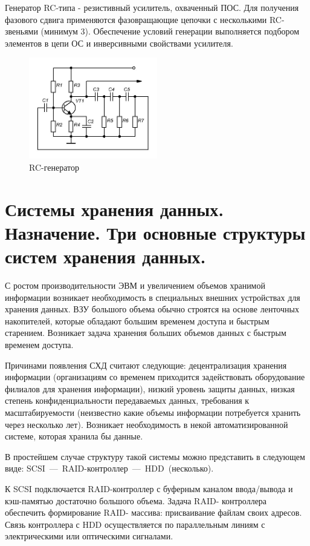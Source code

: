 \documentclass[unicode, 12pt, a4paper, oneside]{article}
\begin{document}
Генератор RC-типа - резистивный усилитель, охваченный ПОС. Для получения фазового сдвига применяются фазовращающие цепочки с несколькими RC-звеньями (минимум 3). Обеспечение условий генерации выполняется подбором элементов в цепи ОС и инверсивными свойствами усилителя.

\begin{figure}[H]
\centering
\includegraphics[width=0.5\textwidth]{150_rc.jpg}
\caption{RC-генератор}
\end{figure}

\section{Системы хранения данных. Назначение. Три основные структуры систем хранения данных.}

С ростом производительности ЭВМ и увеличением объемов хранимой информации возникает необходимость в специальных внешних устройствах для хранения данных. ВЗУ большого объема обычно строятся на основе ленточных накопителей, которые обладают большим временем доступа и быстрым старением. Возникает задача хранения больших объемов данных с быстрым временем доступа.

Причинами появления СХД считают следующие: децентрализация хранения информации (организациям со временем приходится задействовать оборудование филиалов для хранения информации), низкий уровень защиты данных, низкая степень конфиденциальности передаваемых данных, требования к масштабируемости (неизвестно какие объемы информации потребуется хранить через несколько лет). Возникает необходимость в некой автоматизированной системе, которая хранила бы данные.

В простейшем случае структуру такой системы можно представить в следующем виде: \mbox{SCSI --- RAID-контроллер --- HDD (несколько)}.

К SCSI подключается RAID-контроллер с буферным каналом ввода/вывода и кэш-памятью достаточно большого объема. Задача RAID- контроллера обеспечить формирование RAID- массива: присваивание файлам своих адресов. Связь контроллера с HDD осуществляется по параллельным линиям с электрическими или оптическими сигналами.
\end{document}

